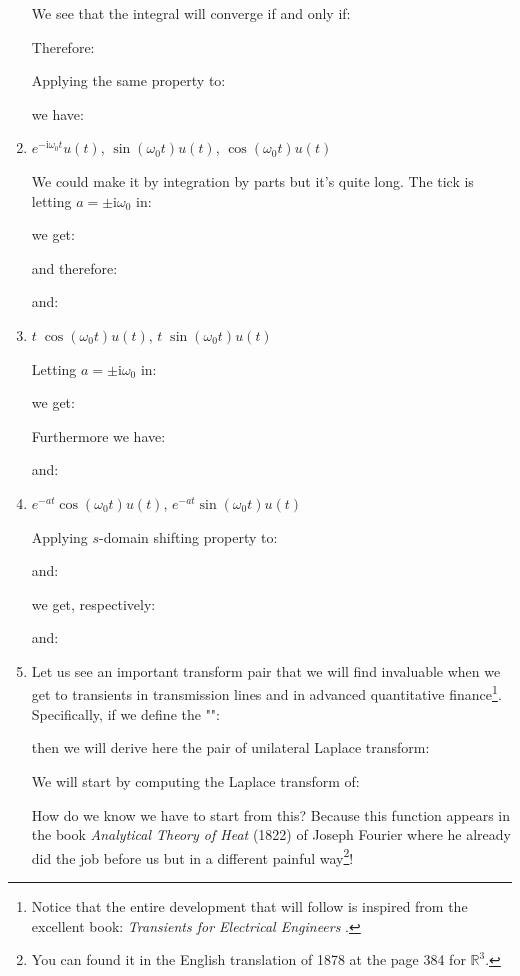\begin{enumerate}
		We see that the integral will converge if and only if:
		
		Therefore:
		

		Applying the same property to:
		
		we have:
		
		
		\item $e^{-\mathrm{i}\omega_0 t}u(t)$, $\sin(\omega_0 t)u(t)$, $\cos(\omega_0 t)u(t)$ 
		
		We could make it by integration by parts but it's quite long. The tick is letting $a=\pm \mathrm{i}\omega_0$ in:
		
		we get:
		
		and therefore:
		
		and:
		
		
		\item $t\;\cos(\omega_0 t)u(t)$, $t\;\sin(\omega_0 t)u(t)$ 
		
		Letting $a=\pm \mathrm{i}\omega_0$ in:
		
		we get:
		
		Furthermore we have:
		
		and:
		
		
		\item $e^{-at}\cos(\omega_0 t) u(t)$,  $e^{-at}\sin(\omega_0 t) u(t)$  
		
		Applying $s$-domain shifting property to:
		
		and:
		
		we get, respectively:
		
		and:
		
		
		\item \label{Laplace pair for finance and telegrapher equation}Let us see an important transform pair that we will find invaluable when we get to transients in transmission lines and in advanced quantitative finance\footnote{ Notice that the entire development that will follow is inspired from the excellent book: \textit{Transients for Electrical Engineers} \pageref{nahin2018transients}.}. Specifically, if we define the "":
		
		then we will derive here the pair of unilateral Laplace transform:
		
		\begin{dem}
		We will start by computing the Laplace transform of:
		
		How do we know we have to start from this? Because this function appears in the book \textit{Analytical Theory of Heat} (1822) of Joseph Fourier where he already did the job before us but in a different painful way\footnote{You can found it in the English translation of 1878 \cite{fourier2003analytical} at the page 384 for $\mathbb{R}^3$.}!
		

\end{dem}
\end{enumerate}
